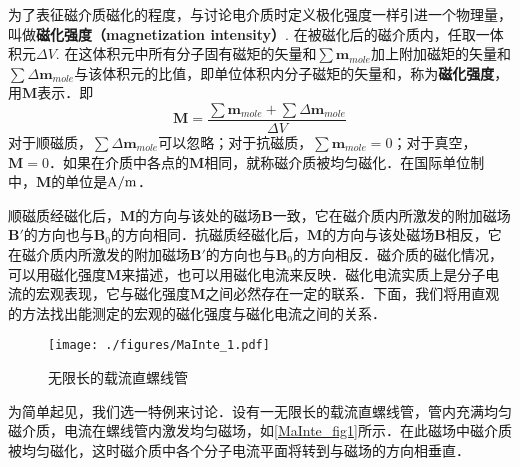 
为了表征磁介质磁化的程度，与讨论电介质时定义极化强度一样引进一个物理量，叫做\textbf{磁化强度（magnetization intensity）}. 在被磁化后的磁介质内，任取一体积元$\Delta V$. 在这体积元中所有分子固有磁矩的矢量和$\sum \mathbf{m}_{mole}$加上附加磁矩的矢量和$\sum \Delta\mathbf{m}_{mole}$与该体积元的比值，即单位体积内分子磁矩的矢量和，称为\textbf{磁化强度}，用$\mathbf M$表示．即
\begin{equation}\label{MaInte_eq2}
\mathbf M=\frac{\sum \mathbf m_{mole}+\sum \Delta \mathbf m_{mole}}{\Delta V}
\end{equation}
对于顺磁质，$\sum \Delta\mathbf{m}_{mole}$可以忽略；对于抗磁质，$\sum \mathbf{m}_{mole}=0$；对于真空，$\mathbf M=0$．如果在介质中各点的$\mathbf M $相同，就称磁介质被均匀磁化．在国际单位制中，$\mathbf M$的单位是$\rm A/m$．

顺磁质经磁化后，$\mathbf M $的方向与该处的磁场$\mathbf B $一致，它在磁介质内所激发的附加磁场$\mathbf B' $的方向也与$\mathbf B_0$的方向相同．抗磁质经磁化后，$\mathbf M $的方向与该处磁场$\mathbf B $相反，它在磁介质内所激发的附加磁场$\mathbf B' $的方向也与$\mathbf B_0 $的方向相反．磁介质的磁化情况，可以用磁化强度$\mathbf M $来描述，也可以用磁化电流来反映．磁化电流实质上是分子电流的宏观表现，它与磁化强度$\mathbf M $之间必然存在一定的联系．下面，我们将用直观的方法找出能测定的宏观的磁化强度与磁化电流之间的关系．
\begin{figure}[ht]
\centering
\texttt{[image: ./figures/MaInte\_1.pdf]}
\caption{无限长的载流直螺线管} \label{MaInte_fig1}
\end{figure}
为简单起见，我们选一特例来讨论．设有一无限长的载流直螺线管，管内充满均匀磁介质，电流在螺线管内激发均匀磁场，如\autoref{MaInte_fig1}所示．在此磁场中磁介质被均匀磁化，这时磁介质中各个分子电流平面将转到与磁场的方向相垂直．

